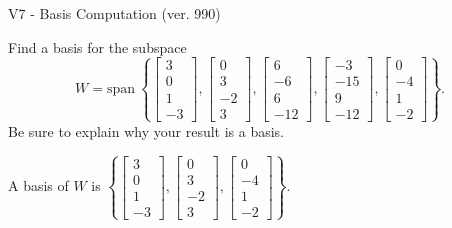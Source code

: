 \begin{exercise}
  \begin{exerciseTitle}V7 - Basis Computation (ver. 990)\end{exerciseTitle}
  \begin{exerciseStatement}
    Find a basis for the subspace 
\[W=\mathrm{span}\ \left\{\left[\begin{array}{r}
3 \\
0 \\
1 \\
-3
\end{array}\right] , \left[\begin{array}{r}
0 \\
3 \\
-2 \\
3
\end{array}\right] , \left[\begin{array}{r}
6 \\
-6 \\
6 \\
-12
\end{array}\right] , \left[\begin{array}{r}
-3 \\
-15 \\
9 \\
-12
\end{array}\right] , \left[\begin{array}{r}
0 \\
-4 \\
1 \\
-2
\end{array}\right]\right\}.\]
 Be sure to explain why your result is a basis.


  \end{exerciseStatement}
  \begin{exerciseAnswer}
   A basis of \(W\) is  \(\left\{\left[\begin{array}{r}
3 \\
0 \\
1 \\
-3
\end{array}\right] , \left[\begin{array}{r}
0 \\
3 \\
-2 \\
3
\end{array}\right] , \left[\begin{array}{r}
0 \\
-4 \\
1 \\
-2
\end{array}\right]\right\}\).
  


  \end{exerciseAnswer}
\end{exercise}